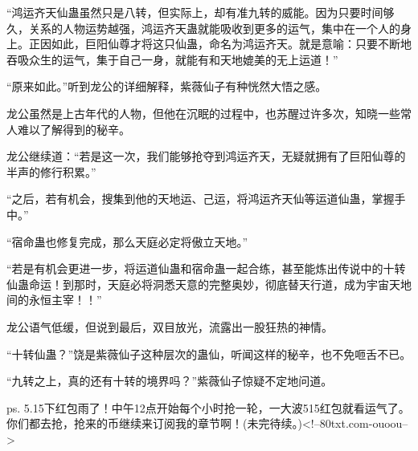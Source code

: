 \begin{this_body}
“鸿运齐天仙蛊虽然只是八转，但实际上，却有准九转的威能。因为只要时间够久，关系的人物运势越强，鸿运齐天蛊就能吸收到更多的运气，集中在一个人的身上。正因如此，巨阳仙尊才将这只仙蛊，命名为鸿运齐天。就是意喻：只要不断地吞吸众生的运气，集于自己一身，就能有和天地媲美的无上运道！”

“原来如此。”听到龙公的详细解释，紫薇仙子有种恍然大悟之感。

龙公虽然是上古年代的人物，但他在沉眠的过程中，也苏醒过许多次，知晓一些常人难以了解得到的秘辛。

龙公继续道：“若是这一次，我们能够抢夺到鸿运齐天，无疑就拥有了巨阳仙尊的半声的修行积累。”

“之后，若有机会，搜集到他的天地运、己运，将鸿运齐天仙等运道仙蛊，掌握手中。”

“宿命蛊也修复完成，那么天庭必定将傲立天地。”

“若是有机会更进一步，将运道仙蛊和宿命蛊一起合练，甚至能炼出传说中的十转仙蛊命运！到那时，天庭必将洞悉天意的完整奥妙，彻底替天行道，成为宇宙天地间的永恒主宰！！”

龙公语气低缓，但说到最后，双目放光，流露出一股狂热的神情。

“十转仙蛊？”饶是紫薇仙子这种层次的蛊仙，听闻这样的秘辛，也不免咂舌不已。

“九转之上，真的还有十转的境界吗？”紫薇仙子惊疑不定地问道。

ps. 5.15下红包雨了！中午12点开始每个小时抢一轮，一大波515红包就看运气了。你们都去抢，抢来的币继续来订阅我的章节啊！(未完待续。)<!--80txt.com-ouoou-->

\end{this_body}

